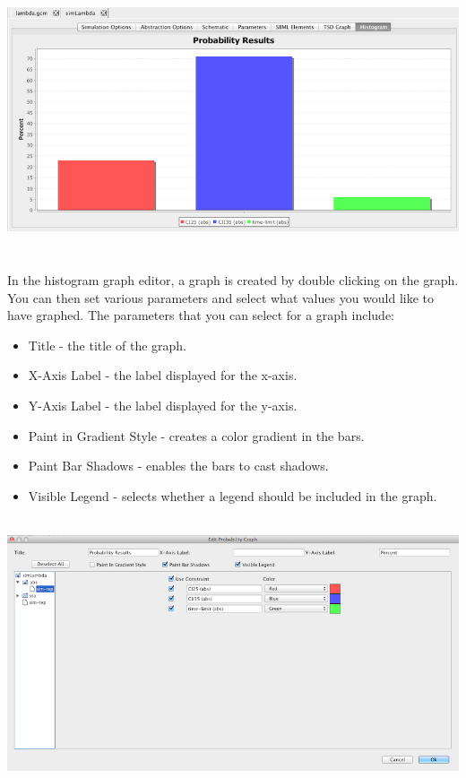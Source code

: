 \documentclass[titlepage,11pt]{article}
\begin{document}
\begin{center} 
\includegraphics[height=80mm]{screenshots/probResults}
\end{center}

In the histogram graph editor, a graph is created by double clicking on the graph. You can then set various parameters and select what values you would like to have graphed. The parameters that you can select for a graph include: 
\begin{itemize}
\item Title - the title of the graph.
\item X-Axis Label - the label displayed for the x-axis. 
\item Y-Axis Label - the label displayed for the y-axis. 
\item Paint in Gradient Style - creates a color gradient in the bars.
\item Paint Bar Shadows - enables the bars to cast shadows.
\item Visible Legend - selects whether a legend should be included in the graph.
\end{itemize}

\begin{center}
\includegraphics[height=80mm]{screenshots/editProbGraph}
\end{center}
\end{document}
